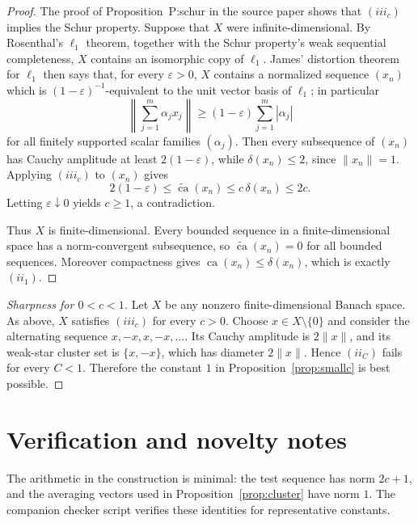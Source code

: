 \documentclass[11pt]{article}
\newcommand{\ca}{\operatorname{ca}}
\newcommand{\wca}{\widetilde{\operatorname{ca}}}
\begin{document}
\begin{proof}
The proof of Proposition~\textup{P:schur} in the source paper shows that
\((iii_c)\) implies the Schur property.  Suppose that \(X\) were
infinite-dimensional.  By Rosenthal's \(\ell_1\) theorem, together with the
Schur property's weak sequential completeness, \(X\) contains an isomorphic
copy of \(\ell_1\).  James' distortion theorem for \(\ell_1\) then says that,
for every \(\varepsilon>0\), \(X\) contains a normalized sequence
\((x_n)\) which is \((1-\varepsilon)^{-1}\)-equivalent to the unit vector
basis of \(\ell_1\); in particular
\[
  \left\|\sum_{j=1}^m \alpha_j x_j\right\|
  \ge (1-\varepsilon)\sum_{j=1}^m|\alpha_j|
\]
for all finitely supported scalar families \((\alpha_j)\).
Then every subsequence of \((x_n)\) has Cauchy amplitude at least
\(2(1-\varepsilon)\), while \(\delta(x_n)\le2\), since \(\|x_n\|=1\).  Applying
\((iii_c)\) to \((x_n)\) gives
\[
  2(1-\varepsilon)\le \wca(x_n)\le c\,\delta(x_n)\le2c.
\]
Letting \(\varepsilon\downarrow0\) yields \(c\ge1\), a contradiction.

Thus \(X\) is finite-dimensional.  Every bounded sequence in a
finite-dimensional space has a norm-convergent subsequence, so
\(\wca(x_n)=0\) for all bounded sequences.  Moreover compactness gives
\(\ca(x_n)\le\delta(x_n)\), which is exactly \((ii_1)\).
\end{proof}

\begin{proof}[Sharpness for \(0<c<1\)]
Let \(X\) be any nonzero finite-dimensional Banach space.  As above, \(X\)
satisfies \((iii_c)\) for every \(c>0\).  Choose \(x\in X\setminus\{0\}\) and
consider the alternating sequence \(x,-x,x,-x,\dots\).  Its Cauchy amplitude
is \(2\|x\|\), and its weak-star cluster set is \(\{x,-x\}\), which has
diameter \(2\|x\|\).  Hence \((ii_C)\) fails for every \(C<1\).  Therefore
the constant \(1\) in Proposition~\ref{prop:smallc} is best possible.
\end{proof}

\section*{Verification and novelty notes}

The arithmetic in the construction is minimal: the test sequence has norm
\(2c+1\), and the averaging vectors used in Proposition~\ref{prop:cluster}
have norm \(1\).  The companion checker script verifies these identities for
representative constants.
\end{document}
